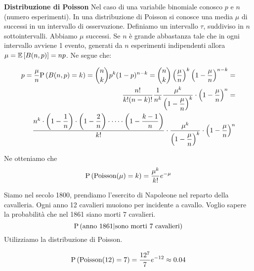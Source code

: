 \begin{defn}
    \textbf{Distribuzione di Poisson}
    Nel caso di una variabile binomiale conosco $ p $ e $ n $ (numero esperimenti).
    In una distribuzione di Poisson si conosce una media $ \mu $ di successi in un intervallo di osservazione.
    Definiamo un intervallo $ \tau $, suddiviso in $ n $ sottointervalli. Abbiamo $ \mu $ successi. Se $ n $ è grande abbastanza tale che in ogni intervallo avviene 1 evento, generati da $ n $ esperimenti indipendenti allora $ \mu = \mathbb{E}\left[B(n,p)\right] = np$. Ne segue che:
    
    \begin{equation*}
    \begin{aligned}
    p = \dfrac{\mu}{n} 
    \text{P}\left(B(n,p) = k\right) = \binom{n}{k}p^k(1-p)^{n-k} = \binom{n}{k} \left(\dfrac{\mu}{n}\right)^k \left(1- \dfrac{\mu}{n}\right)^{n-k} 
    = \\ \dfrac{n!}{k!(n-k)!} \dfrac{1}{n^k} \dfrac{\mu^k}{\left(1-\dfrac{\mu}{n}\right)^k} \cdot \left(1-\dfrac{\mu}{n}\right)^n  
    = \\ \dfrac{n^k \cdot \left(1-\dfrac{1}{n} \right) \cdot \left(1-\dfrac{2}{n}\right) \cdot \dots \cdot \left(1- \dfrac{k-1}{n}\right)}{k!} \cdot \dfrac{\mu^k}{\left(1-\dfrac{\mu}{n}\right)^k} \cdot \left(1-\dfrac{\mu}{n}\right)^n 
    \end{aligned}
    \end{equation*}
    
    Ne otteniamo che 
    \begin{equation}
    \text{P}\left(\text{Poisson}(\mu) = k\right) = \dfrac{\mu^k}{k!} e^{-\mu}
    \end{equation}
    
\end{defn}

\begin{exmp}
    Siamo nel secolo 1800, prendiamo l'esercito di Napoleone nel reparto della cavalleria. Ogni anno 12 cavalieri muoiono per incidente a cavallo. Voglio sapere la probabilità che nel 1861 siano morti 7 cavalieri.
    \begin{equation*}
    \text{P}\left(\text{anno } 1861 | \text{sono morti 7 cavalieri}\right)
    \end{equation*}
    Utilizziamo la distribuzione di Poisson.
    
    \begin{equation*}
    \text{P}\left(\text{Poisson}(12) = 7\right) = \dfrac{12^7}{7}e^{-12} \approx 0.04
    \end{equation*}
    
\end{exmp}

